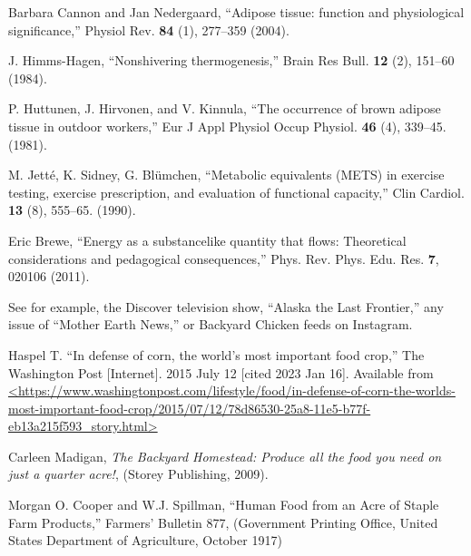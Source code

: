 \documentclass[prb,preprint]{revtex4-2}
\begin{document}
\begin{thebibliography}{99}
Barbara Cannon and Jan Nedergaard,
``Adipose tissue: function and physiological significance,''
Physiol Rev. 
\textbf{84} (1), 
277--359 (2004). 

J. Himms-Hagen,
``Nonshivering thermogenesis,'' 
Brain Res Bull. 
\textbf{12} (2),
151--60 (1984). 

P. Huttunen, J. Hirvonen, and V. Kinnula, 
``The occurrence of brown adipose tissue in outdoor workers,''
Eur J Appl Physiol Occup Physiol. 
\textbf{46} (4), 339--45. 
(1981).

M. Jetté, K. Sidney, G. Blümchen, 
``Metabolic equivalents (METS) in exercise testing, exercise prescription, and evaluation of functional capacity,'' 
Clin Cardiol. 
\textbf{13} (8), 555--65. 
(1990).

Eric Brewe,
``Energy as a substancelike quantity that flows: Theoretical considerations
and pedagogical consequences,''
Phys. Rev. Phys. Edu. Res.
\textbf{7}, 020106
(2011). 

See for example, the Discover television show, ``Alaska the Last Frontier,'' any issue of ``Mother Earth News,'' or Backyard Chicken feeds on Instagram.  
 
 
Haspel T.
``In defense of corn, the world’s most important food crop,''
The Washington Post [Internet].
2015 July 12 [cited 2023 Jan 16].
Available from \url{<https://www.washingtonpost.com/lifestyle/food/in-defense-of-corn-the-worlds-most-important-food-crop/2015/07/12/78d86530-25a8-11e5-b77f-eb13a215f593_story.html>}

Carleen Madigan, 
\textit{The Backyard Homestead: Produce all the food you need on just a quarter acre!},
(Storey Publishing, 2009).


Morgan O. Cooper and W.J. Spillman,
``Human Food from an Acre of Staple Farm Products,''
Farmers' Bulletin 877,
(Government Printing Office, United States Department of Agriculture,
October 1917)


\end{thebibliography}
\end{document}
